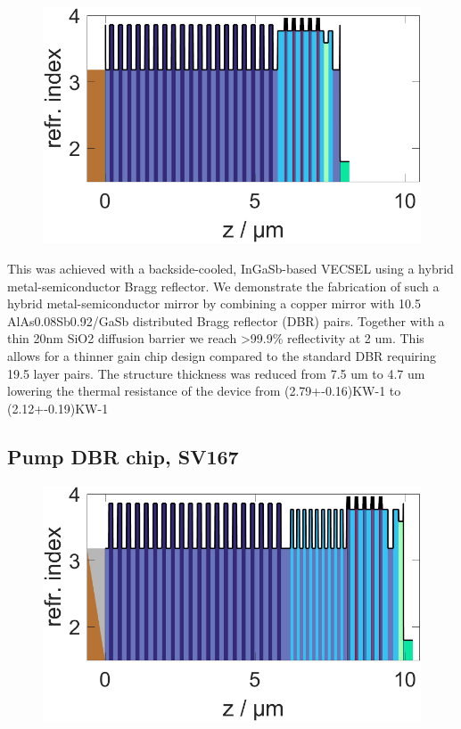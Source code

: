 \begin{figure}
    \centering
    \includegraphics[width=.98\textwidth]{images/1SV166.lay.png}
    \caption{}
    \label{fig:sv166}
\end{figure}

This was achieved with a backside-cooled, InGaSb-based VECSEL using a hybrid metal-semiconductor Bragg reflector. We demonstrate the fabrication of such a hybrid metal-semiconductor mirror by combining a copper mirror with 10.5 AlAs0.08Sb0.92/GaSb distributed Bragg reflector (DBR) pairs. Together with a thin 20nm SiO2 diffusion barrier we reach >99.9\% reflectivity at 2 um. This allows for a thinner gain chip design compared to the standard DBR requiring 19.5 layer pairs. The structure thickness was reduced from 7.5 um to 4.7 um lowering the thermal resistance of the device from (2.79+-0.16)KW-1 to (2.12+-0.19)KW-1


\subsection*{Pump DBR chip, SV167}

\begin{figure}
    \centering
    \includegraphics[width=.98\textwidth]{images/1SV167B.lay.png}
    \caption{}
    \label{fig:sv167}
\end{figure}

